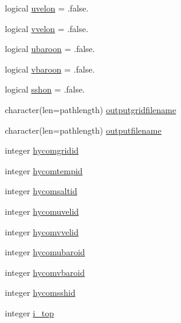 \begin{DoxyCompactItemize}
logical \mbox{\hyperlink{structmodulehycomformat_1_1t__hycomformat_aa784470efea170d578ebece7456c0563}{uvelon}} = .false.
\item 
logical \mbox{\hyperlink{structmodulehycomformat_1_1t__hycomformat_adf2e7a535fa2ae851b7a0f9170a1f586}{vvelon}} = .false.
\item 
logical \mbox{\hyperlink{structmodulehycomformat_1_1t__hycomformat_a87232d247bbfa3fe2b04e974ebb9742d}{ubaroon}} = .false.
\item 
logical \mbox{\hyperlink{structmodulehycomformat_1_1t__hycomformat_aa23ffeabeaf1959d357308635baef1dd}{vbaroon}} = .false.
\item 
logical \mbox{\hyperlink{structmodulehycomformat_1_1t__hycomformat_a3c9105e237f28068cc575a351033acbb}{sshon}} = .false.
\item 
character(len=pathlength) \mbox{\hyperlink{structmodulehycomformat_1_1t__hycomformat_aa7b3725c38f58ea7804a9c0d5a557cf5}{outputgridfilename}}
\item 
character(len=pathlength) \mbox{\hyperlink{structmodulehycomformat_1_1t__hycomformat_a5e66e12db6b61b9fb9135c1883b7e91c}{outputfilename}}
\item 
integer \mbox{\hyperlink{structmodulehycomformat_1_1t__hycomformat_a1d5b9ab1081025dc35df9630f4491f67}{hycomgridid}}
\item 
integer \mbox{\hyperlink{structmodulehycomformat_1_1t__hycomformat_a924c998ae167acd06d253ebf5e506ff7}{hycomtempid}}
\item 
integer \mbox{\hyperlink{structmodulehycomformat_1_1t__hycomformat_aba116330bd56182a258507c15f2e1ef6}{hycomsaltid}}
\item 
integer \mbox{\hyperlink{structmodulehycomformat_1_1t__hycomformat_a8c01f136f7391d78aca1cec60bd817fa}{hycomuvelid}}
\item 
integer \mbox{\hyperlink{structmodulehycomformat_1_1t__hycomformat_a4c654aa8a5cd8092e55f9165499e8507}{hycomvvelid}}
\item 
integer \mbox{\hyperlink{structmodulehycomformat_1_1t__hycomformat_afda0c5c785943dedf719b2d2d0d52612}{hycomubaroid}}
\item 
integer \mbox{\hyperlink{structmodulehycomformat_1_1t__hycomformat_a2b0f5d9ba58eb71f55498e50985e97bb}{hycomvbaroid}}
\item 
integer \mbox{\hyperlink{structmodulehycomformat_1_1t__hycomformat_a8968fd5332bb77f0d21615dd2df5aace}{hycomsshid}}
\item 
integer \mbox{\hyperlink{structmodulehycomformat_1_1t__hycomformat_a1a4e9eaa1f640540bc1b2b642c26854e}{i\+\_\+top}}

\end{DoxyCompactItemize}
